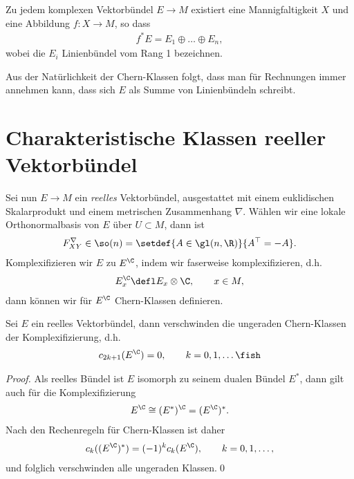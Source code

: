 \documentclass[%
	paper=a5,%
	fleqn,%
	DIV=18,%
	BCOR=0mm,
	fontsize=11pt,
	titlepage=false,%
	bibliography=totoc,
	DIV=18,%
	twoside=true,
	pdftitle=Riemannsche Geometrie,
	pdfauthor=Uwe Semmelmann,
	numbers=noendperiod]%
	{scrbook}
\begin{document}
\begin{prop}
Zu jedem komplexen Vektorbündel $E\to M$ existiert eine Mannigfaltigkeit $X$ und eine Abbildung $f\colon X\to M$, so dass
\begin{align*}
f^*E = E_{1}\oplus \ldots \oplus E_{n},
\end{align*}
wobei die $E_{i}$ Linienbündel vom Rang 1 bezeichnen.\fish
\end{prop}

Aus der Natürlichkeit der Chern-Klassen folgt, dass man f\"ur Rechnungen  immer annehmen kann, dass sich
$E$ als Summe von Linienb\"undeln schreibt.

\section{Charakteristische Klassen reeller Vektorbündel}

Sei nun $E\to M$ ein \textit{reelles} Vektorbündel, ausgestattet mit einem euklidischen Skalarprodukt und einem metrischen Zusammenhang $\nabla$. Wählen wir eine lokale Orthonormalbasis von $E$ über $U\subset M$, dann ist
\begin{align*}
F_{XY}^\nabla \in \so(n) = \setdef{A\in\gl(n,\R)}{A^\top = - A}.
\end{align*}
Komplexifizieren wir $E$ zu $E^\C$, indem wir faserweise komplexifizieren, d.h.
\begin{align*}
E_{x}^\C \defl E_{x}\otimes \C,\qquad x\in M, 
\end{align*}
dann können wir für $E^\C$ Chern-Klassen definieren.

\begin{lem}
Sei $E$ ein reelles Vektorbündel, dann verschwinden die ungeraden Chern-Klassen der Komplexifizierung, d.h.
\begin{align*}
c_{{2k+1}}(E^\C) = 0,\qquad k = 0,1,\ldots\fish
\end{align*}
\end{lem}
\begin{proof}
Als reelles Bündel ist $E$ isomorph zu seinem dualen Bündel $E^*$, dann gilt auch für die Komplexifizierung
\begin{align*}
E^\C \cong (E^*)^\C = (E^\C)^*.
\end{align*}
Nach den Rechenregeln für Chern-Klassen ist daher
\begin{align*}
c_{k}((E^\C)^*) = (-1)^kc_{k}(E^\C),\qquad k=0,1,\ldots,
\end{align*}
und folglich verschwinden alle ungeraden Klassen.\qed
\end{proof}
\end{document}
